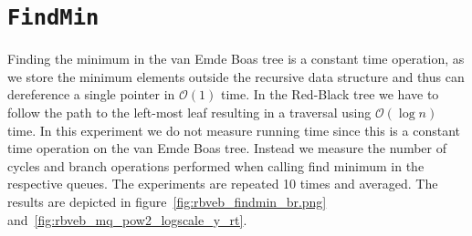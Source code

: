 \documentclass[a4paper,oneside,article,11pt]{memoir}
\begin{document}
\section{\texttt{FindMin}}

Finding the minimum in the van Emde Boas tree is a constant time operation, as we store the minimum elements outside the recursive data structure and thus can dereference a single pointer in $\mathcal{O}(1)$ time. In the Red-Black tree we have to follow the path to the left-most leaf resulting in a traversal using $\mathcal{O}(\log n)$ time. In this experiment we do not measure running time since this is a constant time operation on the van Emde Boas tree. Instead we measure the number of cycles and branch operations performed when calling find minimum in the respective queues. The experiments are repeated 10 times and averaged. The results are depicted in figure~\ref{fig:rbveb_findmin_br.png} and~\ref{fig:rbveb_mq_pow2_logscale_y_rt}.
\end{document}
